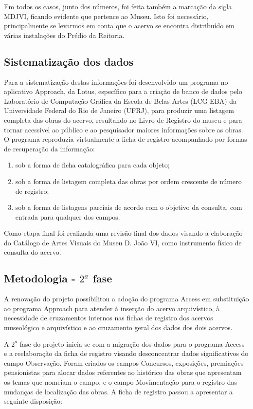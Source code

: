 Em todos os casos, junto dos números, foi feita também a marcação da sigla MDJVI, ficando evidente que pertence ao Museu. Isto foi necessário, principalmente se levarmos em conta que o acervo se encontra distribuído em várias instalações do Prédio da Reitoria.

\subsection{Sistematização dos dados}

Para a sistematização destas informações foi desenvolvido um programa no aplicativo Approach, da Lotus, específico para a criação de banco de dados pelo Laboratório de Computação Gráfica da Escola de Belas Artes (LCG-EBA) da Universidade Federal do Rio de Janeiro (UFRJ), para produzir uma listagem completa das obras do acervo, resultando no Livro de Registro do museu e para tornar acessível ao público e ao pesquisador maiores informações sobre as obras. O programa reproduzia virtualmente a ficha de registro acompanhado por formas de recuperação da informação:

\begin{enumerate}
	\item sob a forma de ficha catalográfica para cada objeto;
	\item sob a forma de listagem completa das obras por ordem crescente de número de registro;
	\item sob a forma de listagens parciais de acordo com o objetivo da consulta, com entrada para qualquer dos campos.
\end{enumerate}

Como etapa final foi realizada uma revisão final dos dados visando a elaboração do Catálogo de Artes Visuais do Museu D. João VI, como instrumento físico de consulta do acervo.

\subsection{Metodologia - $2^a$ fase}

A renovação do projeto possibilitou a adoção do programa Access em substituição ao programa Approach para atender à inserção do acervo arquivístico, à necessidade de cruzamentos internos nas fichas de registro dos acervos museológico e arquivístico e ao cruzamento geral dos dados dos dois acervos.

A $2^a$ fase do projeto inicia-se com a migração dos dados para o programa Access e a reelaboração da ficha de registro visando desconcentrar dados significativos do campo Observação. Foram criados os campos Concursos, exposições, premiações pensionistas para alocar dados referentes ao histórico das obras que apresentam os temas que nomeiam o campo, e o campo Movimentação para o registro das mudanças de localização das obras. A ficha de registro passou a apresentar a seguinte disposição:

